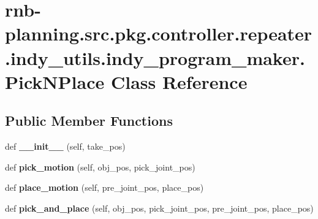 \hypertarget{classrnb-planning_1_1src_1_1pkg_1_1controller_1_1repeater_1_1indy__utils_1_1indy__program__maker_1_1_pick_n_place}{}\section{rnb-\/planning.src.\+pkg.\+controller.\+repeater.\+indy\+\_\+utils.\+indy\+\_\+program\+\_\+maker.\+Pick\+N\+Place Class Reference}
\label{classrnb-planning_1_1src_1_1pkg_1_1controller_1_1repeater_1_1indy__utils_1_1indy__program__maker_1_1_pick_n_place}
\subsection*{Public Member Functions}
\begin{DoxyCompactItemize}
\item 
\mbox{\label{classrnb-planning_1_1src_1_1pkg_1_1controller_1_1repeater_1_1indy__utils_1_1indy__program__maker_1_1_pick_n_place_ac8d48abda35391d1904f488c06e62e1f}} 
def {\bfseries \+\_\+\+\_\+init\+\_\+\+\_\+} (self, take\+\_\+pos)
\item 
\mbox{\label{classrnb-planning_1_1src_1_1pkg_1_1controller_1_1repeater_1_1indy__utils_1_1indy__program__maker_1_1_pick_n_place_a05cd10871cdfc1d2d53cc131268e2cd8}} 
def {\bfseries pick\+\_\+motion} (self, obj\+\_\+pos, pick\+\_\+joint\+\_\+pos)
\item 
\mbox{\label{classrnb-planning_1_1src_1_1pkg_1_1controller_1_1repeater_1_1indy__utils_1_1indy__program__maker_1_1_pick_n_place_a0f93860783aac0d91f2d34883e86acf5}} 
def {\bfseries place\+\_\+motion} (self, pre\+\_\+joint\+\_\+pos, place\+\_\+pos)
\item 
\mbox{\label{classrnb-planning_1_1src_1_1pkg_1_1controller_1_1repeater_1_1indy__utils_1_1indy__program__maker_1_1_pick_n_place_a37d151f06a2d406e5a3973cf82722111}} 
def {\bfseries pick\+\_\+and\+\_\+place} (self, obj\+\_\+pos, pick\+\_\+joint\+\_\+pos, pre\+\_\+joint\+\_\+pos, place\+\_\+pos)
\end{DoxyCompactItemize}
